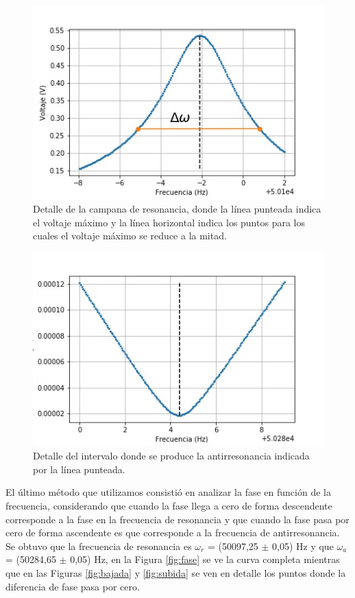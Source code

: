 \documentclass[twoside,twocolumn,a4paper]{article}
\begin{document}
\begin{figure}[H]
\includegraphics[width=\linewidth]{frecVSampC-cam.jpg}
\caption{Detalle de la campana de resonancia, donde la l\'inea punteada indica el voltaje m\'aximo y la l\'inea horizontal indica los puntos para los cuales el voltaje m\'aximo se reduce a la mitad.}
\label{fig:detalleRESamp}
\end{figure}


\begin{figure}[H]
\includegraphics[width=\linewidth]{minimo.jpg}
\caption{Detalle del intervalo donde se produce la antirresonancia indicada por la l\'inea punteada.}
\label{fig:detalleANTamp}
\end{figure}

El \'ultimo m\'etodo que utilizamos consisti\'o en analizar la fase en funci\'on de la frecuencia, considerando que cuando la fase llega a cero de forma descendente corresponde a la fase en la frecuencia de resonancia y que cuando la fase pasa por cero de forma ascendente es que corresponde a la frecuencia de antirresonancia. Se obtuvo que la frecuencia de resonancia es $\omega_{r}$ = (50097,25 $\pm$ 0,05) Hz y que $\omega_{a}$ = (50284,65 $\pm$ 0,05) Hz, en la Figura \ref{fig:fase} se ve la curva completa mientras que en las Figuras \ref{fig:bajada} y \ref{fig:subida} se ven en detalle los puntos donde la diferencia de fase pasa por cero. 
\end{document}
